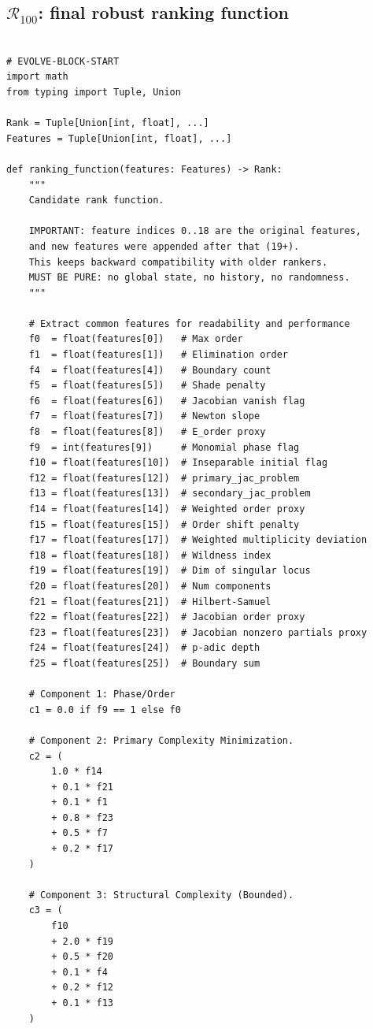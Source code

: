 \documentclass[11pt]{amsart}
\begin{document}
\subsection{$\mathcal{R}_{100}$: final robust ranking function}


\begin{verbatim}

# EVOLVE-BLOCK-START
import math
from typing import Tuple, Union

Rank = Tuple[Union[int, float], ...]
Features = Tuple[Union[int, float], ...]

def ranking_function(features: Features) -> Rank:
    """
    Candidate rank function.

    IMPORTANT: feature indices 0..18 are the original features,
    and new features were appended after that (19+).
    This keeps backward compatibility with older rankers.
    MUST BE PURE: no global state, no history, no randomness.
    """

    # Extract common features for readability and performance
    f0  = float(features[0])   # Max order
    f1  = float(features[1])   # Elimination order
    f4  = float(features[4])   # Boundary count
    f5  = float(features[5])   # Shade penalty
    f6  = float(features[6])   # Jacobian vanish flag
    f7  = float(features[7])   # Newton slope
    f8  = float(features[8])   # E_order proxy
    f9  = int(features[9])     # Monomial phase flag
    f10 = float(features[10])  # Inseparable initial flag
    f12 = float(features[12])  # primary_jac_problem
    f13 = float(features[13])  # secondary_jac_problem
    f14 = float(features[14])  # Weighted order proxy
    f15 = float(features[15])  # Order shift penalty
    f17 = float(features[17])  # Weighted multiplicity deviation
    f18 = float(features[18])  # Wildness index
    f19 = float(features[19])  # Dim of singular locus
    f20 = float(features[20])  # Num components
    f21 = float(features[21])  # Hilbert-Samuel
    f22 = float(features[22])  # Jacobian order proxy
    f23 = float(features[23])  # Jacobian nonzero partials proxy
    f24 = float(features[24])  # p-adic depth
    f25 = float(features[25])  # Boundary sum

    # Component 1: Phase/Order
    c1 = 0.0 if f9 == 1 else f0

    # Component 2: Primary Complexity Minimization.
    c2 = (
        1.0 * f14
        + 0.1 * f21
        + 0.1 * f1
        + 0.8 * f23
        + 0.5 * f7
        + 0.2 * f17
    )

    # Component 3: Structural Complexity (Bounded).
    c3 = (
        f10
        + 2.0 * f19
        + 0.5 * f20
        + 0.1 * f4
        + 0.2 * f12
        + 0.1 * f13
    )


\end{verbatim}
\end{document}
